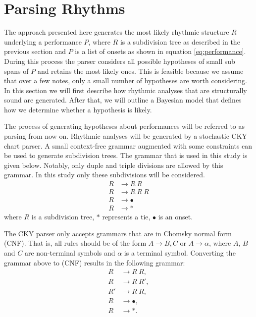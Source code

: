 \section{Parsing Rhythms}

The approach presented here generates the most likely rhythmic structure $R$ underlying a performance $P$, where $R$ is a subdivision tree as described in the previous section and $P$ is a list of onsets as shown in equation \ref{eq:performance}. During this process the parser considers all possible hypotheses of small sub spans of $P$ and retains the most likely ones. This is feasible because we assume that over a few notes, only a small number of hypotheses are worth considering. In this section we will first describe how rhythmic analyses that are structurally sound are generated. After that, we will outline a Bayesian model that defines how we determine whether a hypothesis is likely.

The process of generating hypotheses about performances will be referred to as parsing from now on. Rhythmic analyses will be generated by a stochastic CKY chart parser. A small context-free grammar augmented with some constraints can be used to generate subdivision trees. The grammar that is used in this study is given below.  Notably, only duple and triple divisions are allowed by this grammar. In this study only these subdivisions will be considered.
\begin{align*}
R &\rightarrow R\: R\\
R &\rightarrow R\: R\: R\\
R &\rightarrow \bullet\\
R &\rightarrow *
\end{align*}
where $R$ is a subdivision tree, $*$ represents a tie, $\bullet$ is an onset. 

The CKY parser only accepts grammars that are in Chomsky normal form (CNF). That is, all rules should be of the form $A \rightarrow B, C$ or $A \rightarrow \alpha$, where $A$, $B$ and $C$ are non-terminal symbols and $\alpha$ is a terminal symbol. Converting the grammar above to (CNF) results in the following grammar:
\begin{align*}
R &\rightarrow R\: R,\\
R &\rightarrow R\: R',\\
R' &\rightarrow R\: R,\\
R &\rightarrow \bullet,\\
R &\rightarrow *.
\end{align*}

